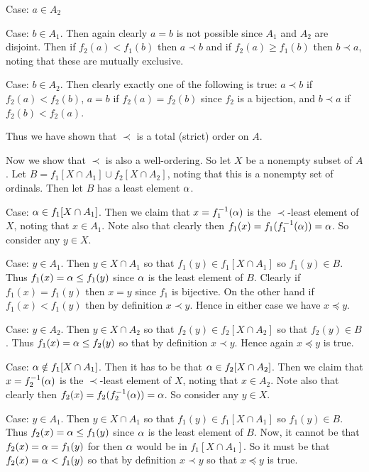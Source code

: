 \begin{solution}
    Case: $a \in A_2$
    \begin{indpar}
        Case: $b \in A_1$.
        Then again clearly $a = b$ is not possible since $A_1$ and $A_2$ are disjoint.
        Then if $f_2(a) < f_1(b)$ then $a \prec b$ and if $f_2(a) \geq f_1(b)$ then $b \prec a$, noting that these are mutually exclusive.

        Case: $b \in A_2$.
        Then clearly exactly one of the following is true: $a \prec b$ if $f_2(a) < f_2(b)$, $a = b$ if $f_2(a) = f_2(b)$ since $f_2$ is a bijection, and $b \prec a$ if $f_2(b) < f_2(a)$.
    \end{indpar}
    Thus we have shown that $\prec$ is a total (strict) order on $A$.

    Now we show that $\prec$ is also a well-ordering.
    So let $X$ be a nonempty subset of $A$.
    Let $B = f_1[X \cap A_1] \cup f_2[X \cap A_2]$, noting that this is a nonempty set of ordinals.
    Then let $B$ has a least element $\alpha$.

    Case: $\alpha \in f_1[X \cap A_1]$.
    Then we claim that $x = f_1^{-1}(\alpha)$ is the $\prec$-least element of $X$, noting that $x \in A_1$.
    Note also that clearly then $f_1(x) = f_1(f_1^{-1}(\alpha)) = \alpha$.
    So consider any $y \in X$.
    \begin{indpar}
        Case: $y \in A_1$.
        Then $y \in X \cap A_1$ so that $f_1(y) \in f_1[X \cap A_1]$ so $f_1(y) \in B$.
        Thus $f_1(x) = \alpha \leq f_1(y)$ since $\alpha$ is the least element of $B$.
        Clearly if $f_1(x) = f_1(y)$ then $x = y$ since $f_1$ is bijective.
        On the other hand if $f_1(x) < f_1(y)$ then by definition $x \prec y$.
        Hence in either case we have $x \preceq y$.

        Case: $y \in A_2$.
        Then $y \in X \cap A_2$ so that $f_2(y) \in f_2[X \cap A_2]$ so that $f_2(y) \in B$.
        Thus $f_1(x) = \alpha \leq f_2(y)$ so that by definition $x \prec y$.
        Hence again $x \preceq y$ is true.
    \end{indpar}

    Case: $\alpha \notin f_1[X \cap A_1]$.
    Then it has to be that $\alpha \in f_2[X \cap A_2]$.
    Then we claim that $x = f_2^{-1}(\alpha)$ is the $\prec$-least element of $X$, noting that $x \in A_2$.
    Note also that clearly then $f_2(x) = f_2(f_2^{-1}(\alpha)) = \alpha$.
    So consider any $y \in X$.
    \begin{indpar}
        Case: $y \in A_1$.
        Then $y \in X \cap A_1$ so that $f_1(y) \in f_1[X \cap A_1]$ so $f_1(y) \in B$.
        Thus $f_2(x) = \alpha \leq f_1(y)$ since $\alpha$ is the least element of $B$.
        Now, it cannot be that $f_2(x) = \alpha = f_1(y)$ for then $\alpha$ would be in $f_1[X \cap A_1]$.
        So it must be that $f_2(x) = \alpha < f_1(y)$ so that by definition $x \prec y$ so that $x \preceq y$ is true.


\end{indpar}
\end{solution}
